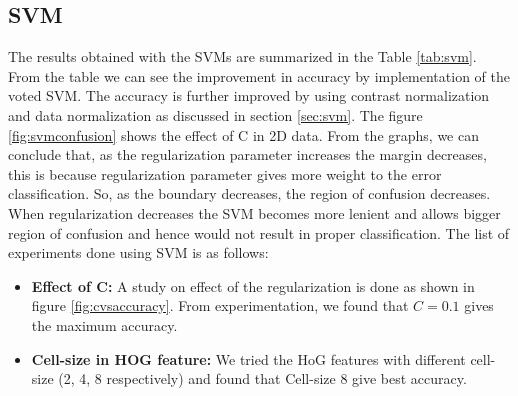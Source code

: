 \documentclass{article} %
\begin{document}
\subsection{SVM}
        The results obtained with the SVMs are summarized in the Table \ref{tab:svm}. From the table we can see the improvement in accuracy by implementation of the voted SVM. The accuracy is further improved by using contrast normalization and data normalization as discussed in section \ref{sec:svm}. 
        The figure \ref{fig:svmconfusion} shows the effect of C in 2D data. From the graphs, we can conclude that, as the regularization parameter increases the margin decreases, this is because regularization parameter gives more weight to the error classification. So, as the boundary decreases, the region of confusion decreases. When regularization decreases  the SVM becomes more lenient and allows bigger region of confusion and hence would not result in proper classification.
        The list of experiments done using SVM is as follows:
\begin{itemize}
\item \textbf{Effect of C:} A study on effect of the regularization is done as shown in figure \ref{fig:cvsaccuracy}. From experimentation, we found that $C=0.1$ gives the maximum accuracy.
\item \textbf{Cell-size in HOG feature:} We tried the HoG features with different cell-size (2, 4, 8 respectively) and found that Cell-size 8 give best accuracy.
\end{itemize}
\end{document}
